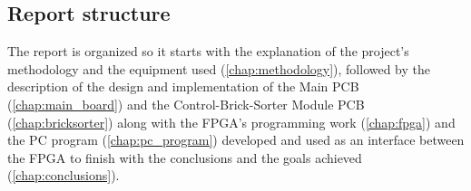 \subsection{Report structure}
The report is organized so it starts with the explanation of the project's methodology  and the equipment used (\ref{chap:methodology}), followed by the description of the design and implementation of the Main PCB (\ref{chap:main_board}) and the Control-Brick-Sorter Module PCB (\ref{chap:bricksorter}) along with the FPGA's programming work (\ref{chap:fpga}) and the PC program (\ref{chap:pc_program}) developed and used as an interface between the FPGA to finish with the conclusions and the goals achieved (\ref{chap:conclusions}).